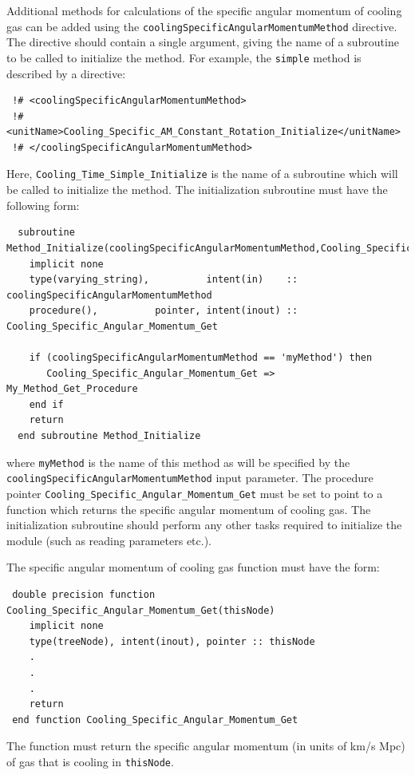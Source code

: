 Additional methods for calculations of the specific angular momentum of cooling gas can be added using the {\tt coolingSpecificAngularMomentumMethod} directive. The directive should contain a single argument, giving the name of a subroutine to be called to initialize the method. For example, the {\tt simple} method is described by a directive:
\begin{verbatim}
 !# <coolingSpecificAngularMomentumMethod>
 !#  <unitName>Cooling_Specific_AM_Constant_Rotation_Initialize</unitName>
 !# </coolingSpecificAngularMomentumMethod>
\end{verbatim}
Here, {\tt Cooling\_Time\_Simple\_Initialize} is the name of a subroutine which will be called to initialize the method. The initialization subroutine must have the following form:
\begin{verbatim}
  subroutine Method_Initialize(coolingSpecificAngularMomentumMethod,Cooling_Specific_Angular_Momentum_Get)
    implicit none
    type(varying_string),          intent(in)    :: coolingSpecificAngularMomentumMethod
    procedure(),          pointer, intent(inout) :: Cooling_Specific_Angular_Momentum_Get
    
    if (coolingSpecificAngularMomentumMethod == 'myMethod') then
       Cooling_Specific_Angular_Momentum_Get => My_Method_Get_Procedure
    end if
    return
  end subroutine Method_Initialize
\end{verbatim}
where {\tt myMethod} is the name of this method as will be specified by the {\tt coolingSpecificAngularMomentumMethod} input parameter. The procedure pointer {\tt Cooling\_Specific\_Angular\_Momentum\_Get} must be set to point to a function which returns the specific angular momentum of cooling gas. The initialization subroutine should perform any other tasks required to initialize the module (such as reading parameters etc.).

The specific angular momentum of cooling gas function must have the form:
\begin{verbatim}
 double precision function Cooling_Specific_Angular_Momentum_Get(thisNode)
    implicit none
    type(treeNode), intent(inout), pointer :: thisNode
    .
    .
    .
    return
 end function Cooling_Specific_Angular_Momentum_Get
\end{verbatim}
The function must return the specific angular momentum (in units of km/s Mpc) of gas that is cooling in {\tt thisNode}.

